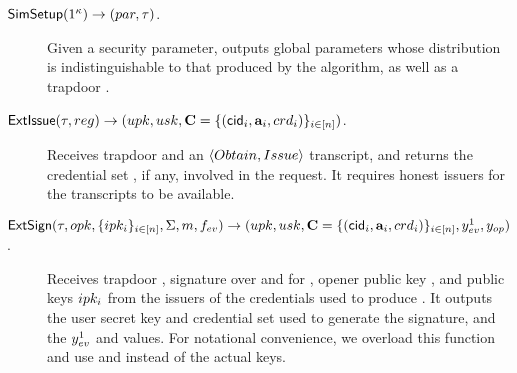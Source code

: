 \begin{description}
\item[$\mathsf{SimSetup}(1^\kappa) \rightarrow (par,\tau)$.] Given a security
  parameter, outputs global parameters \parm whose distribution is
  indistinguishable to that produced by the \Setup algorithm, as well as a
  trapdoor \trap.
\item[$\mathsf{ExtIssue}(\tau,reg) \rightarrow (upk,usk,\mathbf{C}=
  \lbrace(\mathsf{cid}_i,\mathbf{a}_i,crd_i) \rbrace_{i \in [n]})$.]
  Receives trapdoor \trap and an $\langle Obtain, Issue \rangle$ transcript,
  and returns the credential set \sCred, if any, involved in the request. It
  requires honest issuers for the transcripts to be available. 
\item[$\mathsf{ExtSign}(\tau,opk,\lbrace ipk_i \rbrace_{i \in [n]},\Sigma,m,
  f_{ev}) \rightarrow (upk,usk,\mathbf{C}=\lbrace(\mathsf{cid}_i,\mathbf{a}_i,crd_i)
  \rbrace_{i \in [n]},y_{ev}^1,y_{op})$.] Receives trapdoor \trap, signature
  \Sig over \msg and for \feval, opener public key \opk, and public keys
  $ipk_i$ from the issuers of the credentials used to produce \Sig. It outputs
  the user secret key and credential set \sCred used to generate the signature,
  and the $y_{ev}^1$ and \yinsp values. For notational convenience, we overload
  this function and use \oid and \iid instead of the actual keys.


\end{description}

